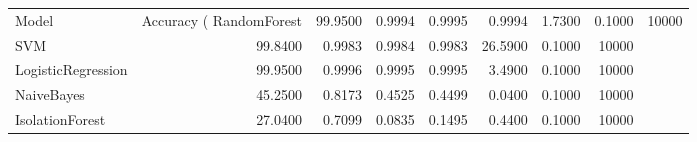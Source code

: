 \begin{tabular}{lrrrrrrr}
\toprule
Model & Accuracy (%
\midrule
RandomForest & 99.9500 & 0.9994 & 0.9995 & 0.9994 & 1.7300 & 0.1000 & 10000 \\
SVM & 99.8400 & 0.9983 & 0.9984 & 0.9983 & 26.5900 & 0.1000 & 10000 \\
LogisticRegression & 99.9500 & 0.9996 & 0.9995 & 0.9995 & 3.4900 & 0.1000 & 10000 \\
NaiveBayes & 45.2500 & 0.8173 & 0.4525 & 0.4499 & 0.0400 & 0.1000 & 10000 \\
IsolationForest & 27.0400 & 0.7099 & 0.0835 & 0.1495 & 0.4400 & 0.1000 & 10000 \\
\bottomrule
\end{tabular}
